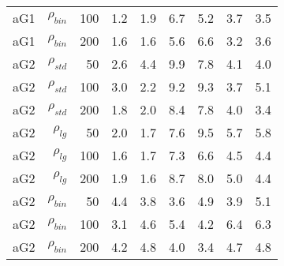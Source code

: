 \documentclass[twoside,11pt]{article}
\begin{document}
\begin{table}
\begin{tabular}{rrrrrrrrr}
aG1   & $\rho_{bin}$ & 100   & 1.2   & 1.9   & 6.7   & 5.2   & 3.7   & 3.5 \\
aG1   & $\rho_{bin}$ & 200   & 1.6   & 1.6   & 5.6   & 6.6   & 3.2   & 3.6 \bigstrut[b]\\
\hline
aG2   & $\rho_{std}$ & 50    & 2.6   & 4.4   & 9.9   & 7.8   & 4.1   & 4.0 \bigstrut[t]\\
aG2   & $\rho_{std}$ & 100   & 3.0   & 2.2   & 9.2   & 9.3   & 3.7   & 5.1 \\
aG2   & $\rho_{std}$ & 200   & 1.8   & 2.0   & 8.4   & 7.8   & 4.0   & 3.4 \bigstrut[b]\\
\hline
aG2   & $\rho_{lg}$ & 50    & 2.0   & 1.7   & 7.6   & 9.5   & 5.7   & 5.8 \bigstrut[t]\\
aG2   & $\rho_{lg}$ & 100   & 1.6   & 1.7   & 7.3   & 6.6   & 4.5   & 4.4 \\
aG2   & $\rho_{lg}$ & 200   & 1.9   & 1.6   & 8.7   & 8.0   & 5.0   & 4.4 \bigstrut[b]\\
\hline
aG2   & $\rho_{bin}$ & 50    & 4.4   & 3.8   & 3.6   & 4.9   & 3.9   & 5.1 \bigstrut[t]\\
aG2   & $\rho_{bin}$ & 100   & 3.1   & 4.6   & 5.4   & 4.2   & 6.4   & 6.3 \\
aG2   & $\rho_{bin}$ & 200   & 4.2   & 4.8   & 4.0   & 3.4   & 4.7   & 4.8 \bigstrut[b]\\
\hline
\end{tabular}%

\label{varrank2}%
\end{table}%
\end{document}
